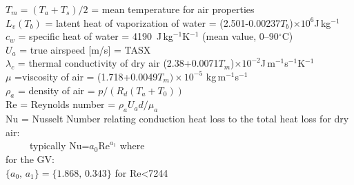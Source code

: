 \documentclass[
  english,
]{book}
\begin{document}
\(T_{m}=(T_{a}+T_{s})/2\) = mean temperature for air properties\\
\(L_{v}(T_{b})\) = latent heat of vaporization of water
= (2.501-0.00237\(T_{b}\))\(\times10^{6}\)J\(\,\)kg\(^{-1}\)\\
\(c_{w}\) =
specific heat of water = 4190~J\(\,\)kg\(^{-1}\)K\(^{-1}\) (mean value,
0--90\(^{\circ}\)C)\\
\(U_{a}\) = true airspeed {[}m/s{]} = TASX\\
\(\lambda_{c}\)
= thermal conductivity
of dry air (2.38+0.0071\(T_{m}\))\(\times10^{-2}\)J\(\,\)m\(^{-1}\)s\(^{-1}\)K\(^{-1}\)\\
\(\mu\)
=viscosity of air = (1.718+0.0049\(T_{m})\times10^{-5}\)
kg\(\,\)m\(^{-1}\)s\(^{-1}\)\\
\(\rho_{a}\) = density
of air = \(p / (R_{d}(T_{a}+T_{0}))\)\\
Re = Reynolds number = \(\rho_{a}U_{a}d/\mu_{a}\)\\
Nu = Nusselt Number relating conduction
heat loss to the total heat loss for dry air:\\
~~~~~typically Nu=\(a_{0}\mathrm{Re}^{a_{1}}\) where\\
\hspace*{0.333em}\hspace*{0.333em}\hspace*{0.333em}\hspace*{0.333em}\hspace*{0.333em}for the GV:\\
\hspace*{0.333em}\hspace*{0.333em}\hspace*{0.333em}\hspace*{0.333em}\hspace*{0.333em}\hspace*{0.333em}\hspace*{0.333em}\hspace*{0.333em}\(\{a_{0},\,a_{1}\}=\{1.868,\,0.343\}\) for Re\textless7244\\
\end{document}
